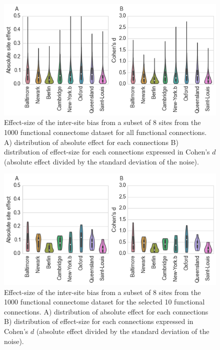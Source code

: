 \documentclass[authoryear]{elsarticle}
\begin{document}
\begin{figure}[tbp]
\begin{center}
\includegraphics[width=\linewidth]{../figures/boxplot_intra_inter_var.png}
\end{center}
\caption[inter vs. intra site variability]{
Effect-size of the inter-site bias from a subset of 8 sites from the 1000 functional connectome dataset for all functional connections. A) distribution of absolute effect for each connections B) distribution of effect-size for each connections expressed in Cohen's $d$ (absolute effect divided by the standard deviation of the noise).
}
\label{fig_site_variability}
\end{figure}


\begin{figure}[tbp]
\begin{center}
\includegraphics[width=\linewidth]{../figures/boxplot_intra_inter_var_seeds.png}
\end{center}
\caption[inter vs. intra site variability]{
Effect-size of the inter-site bias from a subset of 8 sites from the 1000 functional connectome dataset for the selected 10 functional connections. A) distribution of absolute effect for each connections B) distribution of effect-size for each connections expressed in Cohen's $d$ (absolute effect divided by the standard deviation of the noise).
}
\label{fig_site_variability_varseeds}
\end{figure}
\end{document}
